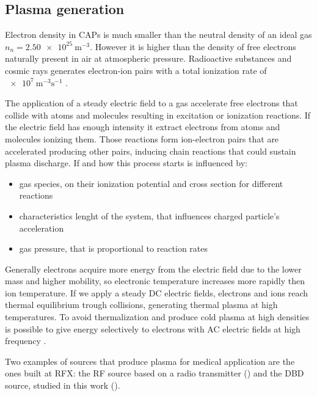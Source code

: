\subsection{Plasma generation}
Electron density in CAPs is much smaller than the neutral density of an ideal gas $n_{n} = \SI{2.50e25}{\meter^{-3}}$. However it is higher than the density of free electrons naturally present in air at atmospheric pressure. Radioactive substances and cosmic rays generates electron-ion pairs with a total ionization rate of $\SI{e7}{\meter^{-3}\second^{-1}}$ \cite{book:1593058}.

The application of a steady electric field to a gas accelerate free electrons that collide with atoms and molecules resulting in excitation or ionization reactions. If the electric field has enough intensity it extract electrons from atoms and molecules ionizing them. Those reactions form ion-electron pairs that are accelerated producing other pairs, inducing chain reactions that could sustain plasma discharge. If and how this process starts is influenced by:
\begin{itemize}
 \item gas species, on their ionization potential and cross section for different reactions
 \item characteristics lenght of the system, that influences charged particle's acceleration
 \item gas pressure, that is proportional to reaction rates
\end{itemize}

Generally electrons acquire more energy from the electric field due to the lower mass and higher mobility, so electronic temperature increases more rapidly then ion temperature. If we apply a steady DC electric fields, electrons and ions reach thermal equilibrium trough collisions, generating thermal plasma at high temperatures. To avoid thermalization and produce cold plasma at high densities is possible to give energy selectively to electrons with AC electric fields at high frequency \cite{BARDOS20106705}.


Two examples of sources that produce plasma for medical application are the ones built at RFX: the RF source based on a radio transmitter (\cite{Martines_2009}) and the DBD source, studied in this work (\cite{DeMasi_2018}).

